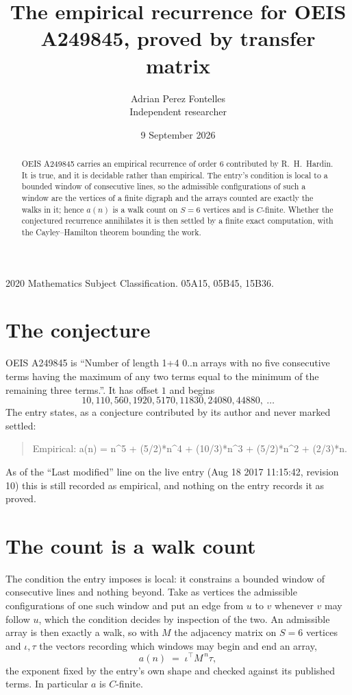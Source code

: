 \documentclass[11pt,a4paper]{article}
\title{The empirical recurrence for OEIS A249845, proved by transfer matrix}
\author{Adrian Perez Fontelles\\ \small Independent researcher}
\date{9 September 2026}
\theoremstyle{plain}
\theoremstyle{definition}
\begin{document}
\maketitle

\begin{abstract}
OEIS A249845 carries an empirical recurrence of order $6$ contributed by R.~H.~Hardin. It is
true, and it is decidable rather than empirical. The entry's condition is local to a bounded window of consecutive lines, so
the admissible configurations of such a window are the vertices of a finite digraph and the
arrays counted are exactly the walks in it; hence $a(n)$ is a walk count on $S=6$ vertices
and is $C$-finite. Whether the conjectured recurrence annihilates it is then settled by a
finite exact computation, with the Cayley--Hamilton theorem bounding the work.
\end{abstract}

\noindent\small 2020 Mathematics Subject Classification. 05A15, 05B45, 15B36.\normalsize

\section{The conjecture}

OEIS A249845 is ``Number of length 1+4 0..n arrays with no five consecutive terms having the maximum of any two terms equal to the minimum of the remaining three terms.''. It has offset $1$ and begins
\[
10, 110, 560, 1920, 5170, 11830, 24080, 44880,\ \dots
\]
The entry states, as a conjecture contributed by its author and never marked settled:
\begin{quote}
Empirical: a(n) = n\^{}5 + (5/2)*n\^{}4 + (10/3)*n\^{}3 + (5/2)*n\^{}2 + (2/3)*n.
\end{quote}
As of the ``Last modified'' line on the live entry (Aug 18 2017 11:15:42, revision 10) this is still
recorded as empirical, and nothing on the entry records it as proved.

\section{The count is a walk count}

The condition the entry imposes is local: it constrains a bounded window of consecutive lines and nothing beyond. Take as
vertices the admissible configurations of one such window and put an edge from $u$ to $v$
whenever $v$ may follow $u$, which the condition decides by inspection of the two. An
admissible array is then exactly a walk, so with $M$ the adjacency matrix on $S=6$ vertices
and $\iota,\tau$ the vectors recording which windows may begin and end an array,
\[
a(n)\;=\;\iota^{\!\top}M^{\,n}\tau ,
\]
the exponent fixed by the entry's own shape and checked against its published terms. In
particular $a$ is $C$-finite.
\end{document}
